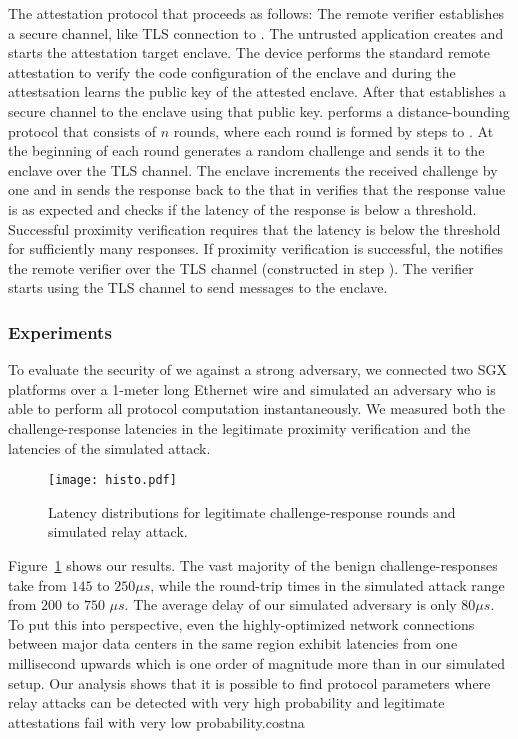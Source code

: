 The \proximitee attestation protocol that proceeds as follows: \one The remote verifier establishes a secure channel, like TLS connection to \key. \two The untrusted application creates and starts the attestation target enclave. \three The \key device performs the standard remote attestation to verify the code configuration of the enclave and during the attestsation learns the public key of the attested enclave. \four After that \key establishes a secure channel to the enclave using that public key. \five \key performs a distance-bounding protocol that consists of $n$ rounds, where each round is formed by steps \five to \eight. At the beginning of each round \key generates a random challenge and sends it to the enclave over the TLS channel. \six The enclave increments the received challenge by one and in \seven sends the response back to the \key that in \eight verifies that the response value is as expected and checks if the latency of the response is below a threshold. Successful proximity verification requires that the latency is below the threshold for sufficiently many responses. \nine If proximity verification is successful, the \key notifies the remote verifier over the TLS channel (constructed in step \one). The verifier starts using the \key TLS channel to send messages to the enclave.

\subsubsection*{Experiments}

To evaluate the security of \proximitee we against a strong adversary, we connected two SGX platforms over a 1-meter long Ethernet wire and simulated an adversary who is able to perform all protocol computation instantaneously. We measured both the challenge-response latencies in the legitimate proximity verification and the latencies of the simulated attack. 

\begin{figure}[t]
  \centering
    \texttt{[image: histo.pdf]} 
    \caption{Latency distributions for legitimate challenge-response rounds and simulated relay attack.}
    \label{graph:histogram}
\end{figure}


Figure~\ref{graph:histogram} shows our results. The vast majority of the benign challenge-responses take from $145$ to $250 \mu s$, while the round-trip times in the simulated attack range from $200$ to $750$ $\mu s$. The average delay of our simulated adversary is only $80 \mu s$. To put this into perspective, even the highly-optimized network connections between major data centers in the same region exhibit latencies from one millisecond upwards which is one order of magnitude more than in our simulated setup. Our analysis shows that it is possible to find protocol parameters where relay attacks can be detected with very high probability and legitimate attestations fail with very low probability.costna


